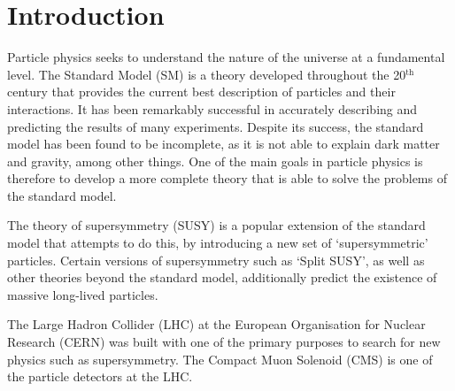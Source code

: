 \chapter{Introduction}
\label{chap:introduction}




Particle physics seeks to understand the nature of the universe at a 
fundamental level. The Standard Model (SM) is a theory developed throughout 
the 20$^{\mathrm{th}}$ century that provides the current best description of 
particles and their interactions. It has been remarkably successful in 
accurately %
describing and predicting the results of many experiments. 
Despite its success, the standard model has been found to be incomplete, as it 
is not able to explain dark matter and gravity, among other things. 
One of the main goals in particle physics is therefore to develop a more 
complete theory that is able to solve the problems of the standard model.

The theory of supersymmetry (SUSY) is a popular extension of the standard model 
that attempts to do this, by introducing a new set of `supersymmetric' 
particles. 
Certain versions of supersymmetry such as `Split SUSY', as well as other 
theories beyond the standard model, additionally predict the existence of 
massive long-lived particles.

The Large Hadron Collider (LHC) at the European Organisation for Nuclear 
Research (CERN) was built with one of the primary purposes to search for 
new physics such as supersymmetry. The Compact Muon Solenoid (CMS) is one of 
the particle detectors at the LHC.

